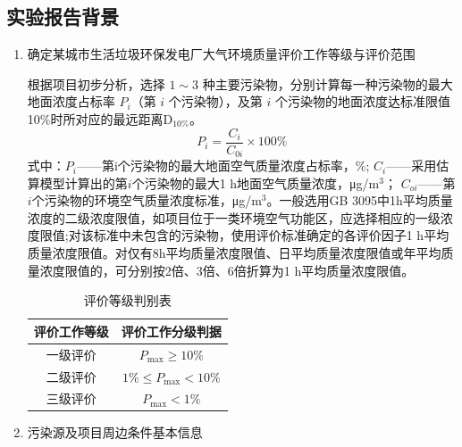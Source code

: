 \subsection{实验报告背景}
\begin{enumerate}
    \item 确定某城市生活垃圾环保发电厂大气环境质量评价工作等级与评价范围
    
    根据项目初步分析，选择 $1\sim3$ 种主要污染物，分别计算每一种污染物的最大地面浓度占标率 $P_i$（第 $i$ 个污染物），及第 $i$ 个污染物的地面浓度达标准限值10\%时所对应的最远距离$\mathrm{D_{10\%}}$。
    \begin{equation} \label{eq:The maximum ground concentration of the pollutant is standardized}
        P_i=\dfrac{C_i}{C_{0i}}\times 100\%
    \end{equation}
    式中：$P_i$——第i个污染物的最大地面空气质量浓度占标率，\%;
    \newline\phantom{式中：}$C_i$——采用估算模型计算出的第$i$个污染物的最大1 h地面空气质量浓度，μg/m$^3$；
    \newline\phantom{式中：}$C_{oi}$——第$i$个污染物的环境空气质量浓度标准，μg/m$^3$。一般选用GB 3095中1h平均质量浓度的二级浓度限值，如项目位于一类环境空气功能区，应选择相应的一级浓度限值;对该标准中未包含的污染物，使用评价标准\cite{HJ2.2-2018}确定的各评价因子1 h平均质量浓度限值。对仅有8h平均质量浓度限值、日平均质量浓度限值或年平均质量浓度限值的，可分别按2倍、3倍、6倍折算为1 h平均质量浓度限值。

    \begin{table}[H]
        \centering
        \caption{评价等级判别表\cite{HJ2.2-2018}}
        \begin{tabular}{cc}
        \toprule
        评价工作等级 & 评价工作分级判据 \\
        \midrule
        一级评价 & $P_{\text{max}} \geqslant  10\%$ \\
        二级评价 & $1\% \leqslant  P_{\text{max}} < 10\%$ \\
        三级评价 & $P_{\text{max}} < 1\%$ \\
        \bottomrule
        \end{tabular}
    \end{table}

    \item 污染源及项目周边条件基本信息
    

\end{enumerate}

